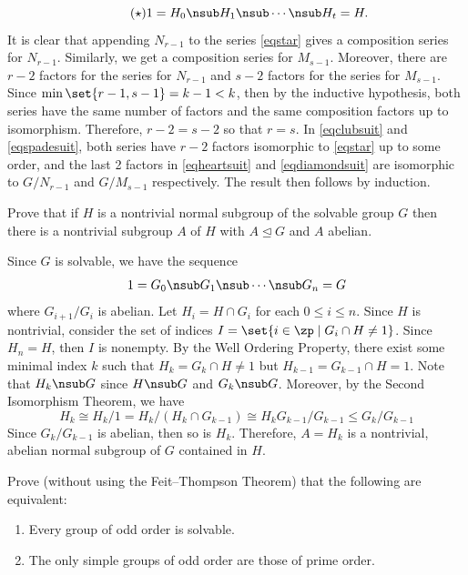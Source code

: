 \begin{sol}
\begin{equation}
        \label{eqstar}
        \tag{$\star$}
        1 = H_0 \nsub H_1 \nsub \cdots \nsub H_t = H.
    \end{equation}
    It is clear that appending $N_{r - 1}$ to the series \eqref{eqstar} gives a composition series for $N_{r - 1}$. Similarly, we get a composition series for $M_{s - 1}$. Moreover, there are $r - 2$ factors for the series for $N_{r - 1}$ and $s - 2$ factors for the series for $M_{s - 1}$. Since $\min\set{r - 1, s - 1} = k - 1 < k$, then by the inductive hypothesis, both series have the same number of factors and the same composition factors up to isomorphism. Therefore, $r - 2 = s - 2$ so that $r = s$. In \eqref{eqclubsuit} and \eqref{eqspadesuit}, both series have $r - 2$ factors isomorphic to \eqref{eqstar} up to some order, and the last 2 factors in \eqref{eqheartsuit} and \eqref{eqdiamondsuit} are isomorphic to $G/N_{r - 1}$ and $G/M_{s - 1}$ respectively. The result then follows by induction.
\end{sol}

\begin{exercise}\label{ex3.4.11}
    Prove that if $H$ is a nontrivial normal subgroup of the solvable group $G$ then there is a nontrivial subgroup $A$ of $H$ with $A \trianglelefteq G$ and $A$ abelian.
\end{exercise}

\begin{sol}
    Since $G$ is solvable, we have the sequence
    \[1 = G_0 \nsub G_1 \nsub \cdots \nsub G_n = G\]
    where $G_{i + 1}/G_i$ is abelian. Let $H_i = H \cap G_i$ for each $0 \leq i \leq n$. Since $H$ is nontrivial, consider the set of indices $I = \set{i \in \zp \mid G_i \cap H \neq 1}$. Since $H_n = H$, then $I$ is nonempty. By the Well Ordering Property, there exist some minimal index $k$ such that $H_k = G_k \cap H \neq 1$ but $H_{k - 1} = G_{k - 1} \cap H = 1$. Note that $H_k \nsub G$ since $H \nsub G$ and $G_k \nsub G$. Moreover, by the Second Isomorphism Theorem, we have
    \[H_k \cong H_k/1 = H_k/(H_k \cap G_{k - 1}) \cong H_k G_{k - 1}/G_{k - 1} \leq G_k/G_{k - 1}\]
    Since $G_k/G_{k - 1}$ is abelian, then so is $H_k$. Therefore, $A = H_k$ is a nontrivial, abelian normal subgroup of $G$ contained in $H$.
\end{sol}

\begin{exercise}\label{ex3.4.12}
    Prove (without using the Feit--Thompson Theorem) that the following are equivalent:
    \begin{enumerate}
    \item[(i)] Every group of odd order is solvable.
    \item[(ii)] The only simple groups of odd order are those of prime order.
    \end{enumerate}
\end{exercise}

